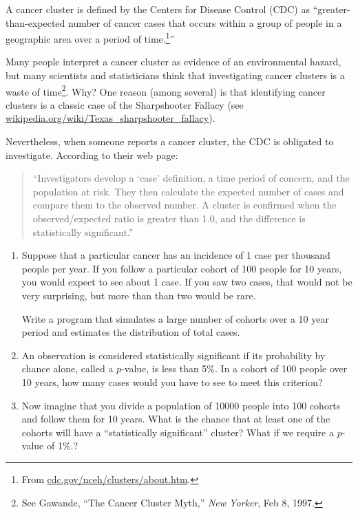 \documentclass[12pt]{book}
\begin{document}
\begin{ex}

A cancer cluster is defined by the Centers for Disease Control (CDC)
as ``greater-than-expected number of cancer cases that occurs within a
group of people in a geographic area over a period of
time.\footnote{From \url{cdc.gov/nceh/clusters/about.htm}.}''

Many people interpret a cancer cluster as evidence of an environmental
hazard, but many scientists and statisticians think that investigating
cancer clusters is a waste of time\footnote{See Gawande, ``The Cancer
  Cluster Myth,'' {\em New Yorker}, Feb 8, 1997.}.  Why?  One reason
(among several) is that identifying cancer clusters is a classic case
of the Sharpshooter Fallacy (see
\url{wikipedia.org/wiki/Texas_sharpshooter_fallacy}).

Nevertheless, when someone reports a cancer cluster, the CDC is
obligated to investigate.  According to their web page:

\begin{quote}

``Investigators develop a `case' definition, a time period of concern,
  and the population at risk. They then calculate the expected number
  of cases and compare them to the observed number. A cluster is
  confirmed when the observed/expected ratio is greater than 1.0, and
  the difference is statistically significant.''

\end{quote}

\begin{enumerate}

\item Suppose that a particular cancer has an incidence of 1 case per
  thousand people per year.  If you follow a particular cohort of 100
  people for 10 years, you would expect to see about 1 case.  If you
  saw two cases, that would not be very surprising, but more than than
  two would be rare.

Write a program that simulates a large number of cohorts over
a 10 year period and estimates the distribution of total cases.

\item An observation is considered statistically significant if its
  probability by chance alone, called a $p$-value, is less than 5\%.
  In a cohort of 100 people over 10 years, how many cases would you
  have to see to meet this criterion?

\item Now imagine that you divide a population of 10000 people into 100
  cohorts and follow them for 10 years.  What is the chance that at
  least one of the cohorts will have a ``statistically significant''
  cluster?  What if we require a $p$-value of 1\%.?


\end{enumerate}
\end{ex}
\end{document}
